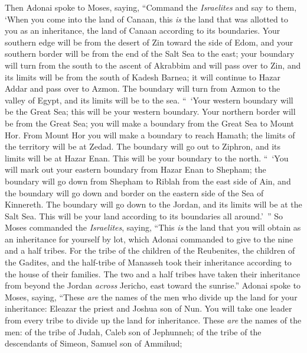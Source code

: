 \begin{biblechapter} %
 Then Adonai spoke to Moses, saying,
\verse “Command the \textit{Israelites} and say to them, ‘When you come into the land of Canaan, this \textit{is} the land that was allotted to you as an inheritance, the land of Canaan according to its boundaries.
\verse Your southern edge will be from the desert of Zin toward the side of Edom, and your southern border will be from the end of the Salt Sea to the east;
\verse your boundary will turn from the south to the ascent of Akrabbim and will pass over to Zin, and its limits will be from the south of Kadesh Barnea; it will continue to Hazar Addar and pass over to Azmon.
\verse The boundary will turn from Azmon to the valley of Egypt, and its limits will be to the sea.
\verse “ ‘Your western boundary will be the Great Sea; this will be your western boundary.
\verse Your northern border will be from the Great Sea; you will make a boundary from the Great Sea to Mount Hor.
\verse From Mount Hor you will make a boundary to reach Hamath; the limits of the territory will be at Zedad.
\verse The boundary will go out to Ziphron, and its limits will be at Hazar Enan. This will be your boundary to the north.
\verse “ ‘You will mark out your eastern boundary from Hazar Enan to Shepham;
\verse the boundary will go down from Shepham to Riblah from the east side of Ain, and the boundary will go down and border on the eastern side of the Sea of Kinnereth.
\verse The boundary will go down to the Jordan, and its limits will be at the Salt Sea. This will be your land according to its boundaries all around.’ ”
\verse So Moses commanded the \textit{Israelites}, saying, “This \textit{is} the land that you will obtain as an inheritance for yourself by lot, which Adonai commanded to give to the nine and a half tribes.
\verse For the tribe of the children of the Reubenites, the children of the Gadites, and the half-tribe of Manasseh took their inheritance according to the house of their families.
\verse The two and a half tribes have taken their inheritance from beyond the Jordan \textit{across} Jericho, east toward the sunrise.”
\verse Adonai spoke to Moses, saying,
\verse “These \textit{are} the names of the men who divide up the land for your inheritance: Eleazar the priest and Joshua son of Nun.
\verse You will take one leader from every tribe to divide up the land for inheritance.
\verse These \textit{are} the names of the men: of the tribe of Judah, Caleb son of Jephunneh;
\verse of the tribe of the descendants of Simeon, Samuel son of Ammihud;

\end{biblechapter}
